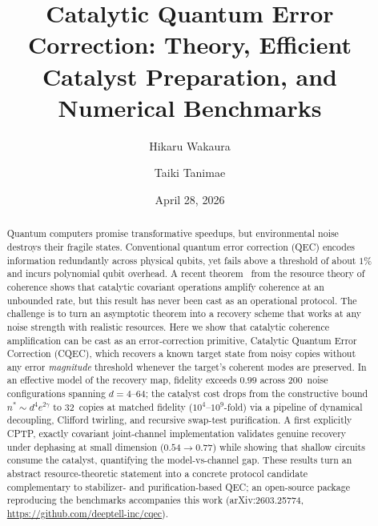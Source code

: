 \documentclass[a4paper,twocolumn]{quantumarticle}
\begin{document}
\title{Catalytic Quantum Error Correction: Theory, Efficient Catalyst Preparation, and Numerical Benchmarks}

\author{Hikaru Wakaura}

\author{Taiki Tanimae}

\date{April 28, 2026}

\begin{abstract}
Quantum computers promise transformative speedups, but environmental noise destroys their fragile states.
Conventional quantum error correction (QEC) encodes information redundantly across physical qubits, yet fails above a threshold of about $1\%$ and incurs polynomial qubit overhead.
A recent theorem~\cite{Shiraishi2024} from the resource theory of coherence shows that catalytic covariant operations amplify coherence at an unbounded rate, but this result has never been cast as an operational protocol.
The challenge is to turn an asymptotic theorem into a recovery scheme that works at any noise strength with realistic resources.
Here we show that catalytic coherence amplification can be cast as an error-correction primitive, Catalytic Quantum Error Correction (CQEC), which recovers a known target state from noisy copies without any error \emph{magnitude} threshold whenever the target's coherent modes are preserved.
In an effective model of the recovery map, fidelity exceeds $0.99$ across 200~noise configurations spanning $d = 4$--$64$; the catalyst cost drops from the constructive bound $n^{*} \sim d^{4} e^{2\gamma}$ to 32~copies at matched fidelity ($10^{4}$--$10^{9}$-fold) via a pipeline of dynamical decoupling, Clifford twirling, and recursive swap-test purification.
A first explicitly CPTP, exactly covariant joint-channel implementation validates genuine recovery under dephasing at small dimension ($0.54 \to 0.77$) while showing that shallow circuits consume the catalyst, quantifying the model-vs-channel gap.
These results turn an abstract resource-theoretic statement into a concrete protocol candidate complementary to stabilizer- and purification-based QEC; an open-source package reproducing the benchmarks accompanies this work (arXiv:2603.25774, \url{https://github.com/deeptell-inc/cqec}).
\end{abstract}

\maketitle
\end{document}
